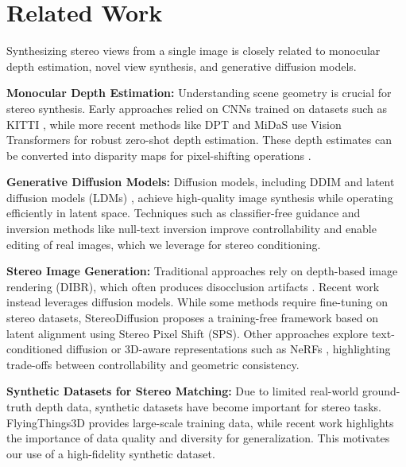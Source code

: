 \section{Related Work}\label{related work}

Synthesizing stereo views from a single image is closely related to monocular depth estimation, novel view synthesis, and generative diffusion models.

\textbf{Monocular Depth Estimation:} Understanding scene geometry is crucial for stereo synthesis. Early approaches relied on CNNs trained on datasets such as KITTI \citep{6248074}, while more recent methods like DPT \citep{ranftl2021visiontransformersdenseprediction} and MiDaS \citep{ranftl2020midas} use Vision Transformers for robust zero-shot depth estimation. These depth estimates can be converted into disparity maps for pixel-shifting operations \citep{Wang-2024-stereodiffusion}.

\textbf{Generative Diffusion Models:} Diffusion models, including DDIM \citep{song2020denoising} and latent diffusion models (LDMs) \citep{rombach2022highresolutionimagesynthesislatent}, achieve high-quality image synthesis while operating efficiently in latent space. Techniques such as classifier-free guidance \citep{ho2022classifier} and inversion methods like null-text inversion \citep{mokady2023null} improve controllability and enable editing of real images, which we leverage for stereo conditioning.

\textbf{Stereo Image Generation:} Traditional approaches rely on depth-based image rendering (DIBR), which often produces disocclusion artifacts \citep{Wang-2024-stereodiffusion}. Recent work instead leverages diffusion models. While some methods require fine-tuning on stereo datasets, StereoDiffusion \citep{Wang-2024-stereodiffusion} proposes a training-free framework based on latent alignment using Stereo Pixel Shift (SPS). Other approaches explore text-conditioned diffusion \citep{garg2025text2stereo} or 3D-aware representations such as NeRFs \citep{gu2023nerfdiff, Liu-2025-stnerf}, highlighting trade-offs between controllability and geometric consistency.

\textbf{Synthetic Datasets for Stereo Matching:} Due to limited real-world ground-truth depth data, synthetic datasets have become important for stereo tasks. FlyingThings3D \citep{Mayer_2016_CVPR} provides large-scale training data, while recent work \citep{yan2026makesgoodsynthetictraining} highlights the importance of data quality and diversity for generalization. This motivates our use of a high-fidelity synthetic dataset.